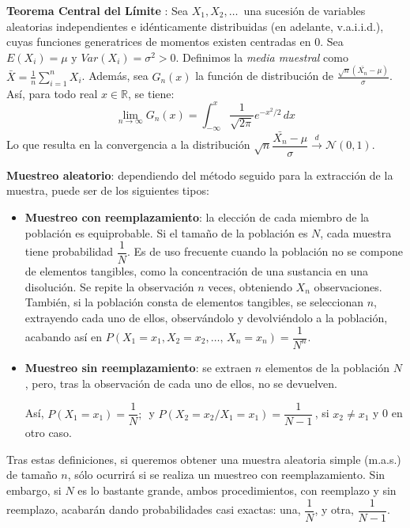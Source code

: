 {\bf Teorema Central del Límite} \label{tma cent lim}: Sea $X_1, X_2, \dots\,$ una sucesión de variables aleatorias independientes e idénticamente distribuidas (en adelante, v.a.i.i.d.), cuyas funciones generatrices de momentos existen centradas en 0. Sea $E(X_i) = \mu \text{ y } Var(X_i) = \sigma^2 > 0$. Definimos la {\sl media muestral} como $\bar{X} = \frac{1}{n} \sum_{i=1}^{n} X_i$. Además, sea $G_n(x)$ la función de distribución de $\frac{\sqrt{n}(\bar{X_n} - \mu)}{\sigma}$. Así, para todo real $x \in \mathbb{R}$, se tiene:
\begin{equation*}
    \lim_{n \rightarrow \infty} G_n(x) = \int_{-\infty}^{x} \dfrac{1}{\sqrt{2\pi}} e^{-x^2/2} \, dx
\end{equation*}
Lo que resulta en la convergencia a la distribución $\sqrt{n}\dfrac{\bar{X_n} - \mu}{\sigma} \xrightarrow{d} \mathcal{N}\left(0, 1\right)$.

{\bf Muestreo aleatorio}: dependiendo del método seguido para la extracción de la muestra, puede ser de los siguientes tipos:
\begin{itemize}
    \item {\bf Muestreo con reemplazamiento}: la elección de cada miembro de la población es equiprobable. Si el tamaño de la población es $N$, cada muestra tiene probabilidad $\dfrac{1}{N}$. Es de uso frecuente cuando la población no se compone de elementos tangibles, como la concentración de una sustancia en una disolución. Se repite la observación $n$ veces, obteniendo $X_n$ observaciones. También, si la población consta de elementos tangibles, se seleccionan $n$, extrayendo cada uno de ellos, observándolo y devolviéndolo a la población, acabando así en $P\left(X_1 = x_1, X_2 = x_2, \dots,\, X_n = x_n\right) = \dfrac{1}{N^n}$.
    \item {\bf Muestreo sin reemplazamiento}: se extraen $n$ elementos de la población $N$, pero, tras la observación de cada uno de ellos, no se devuelven.
    
    Así, $P\left(X_1 = x_1\right) = \dfrac{1}{N};\,$ y $P\left(X_2 = x_2 / X_1 = x_1\right) = \dfrac{1}{N-1}\,$, si $x_2 \neq x_1$ y 0 en otro caso.
\end{itemize}

Tras estas definiciones, si queremos obtener una muestra aleatoria simple (m.a.s.) de tamaño $n$, sólo ocurrirá si se realiza un muestreo con reemplazamiento. Sin embargo, si $N$ es lo bastante grande, ambos procedimientos, con reemplazo y sin reemplazo, acabarán dando probabilidades casi exactas: una, $\dfrac{1}{N}$, y otra, $\dfrac{1}{N-1}$.

